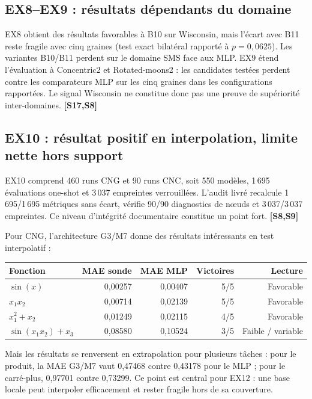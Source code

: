 \documentclass[11pt,a4paper]{article}
\newcommand{\src}[1]{\textbf{[#1]}}
\begin{document}
\subsection{EX8--EX9 : résultats dépendants du domaine}

EX8 obtient des résultats favorables à B10 sur Wisconsin, mais l'écart avec B11 reste fragile avec cinq graines (test exact bilatéral rapporté à \(p=0,0625\)). Les variantes B10/B11 perdent sur le domaine SMS face aux MLP. EX9 étend l'évaluation à Concentric2 et Rotated-moons2 : les candidates testées perdent contre les comparateurs MLP sur les cinq graines dans les configurations rapportées. Le signal Wisconsin ne constitue donc pas une preuve de supériorité inter-domaines. \src{S17,S8}

\subsection{EX10 : résultat positif en interpolation, limite nette hors support}

EX10 comprend 460 runs CNG et 90 runs CNC, soit 550 modèles, 1\,695 évaluations one-shot et 3\,037 empreintes verrouillées. L'audit livré recalcule 1\,695/1\,695 métriques sans écart, vérifie 90/90 diagnostics de nœuds et 3\,037/3\,037 empreintes. Ce niveau d'intégrité documentaire constitue un point fort. \src{S8,S9}

Pour CNG, l'architecture G3/M7 donne des résultats intéressants en test interpolatif :
\begin{center}
\small
\begin{tabular}{lrrrr}
\toprule
Fonction & MAE sonde & MAE MLP & Victoires & Lecture\\
\midrule
$\sin(x)$ & 0,00257 & 0,00407 & 5/5 & Favorable\\
$x_1x_2$ & 0,00714 & 0,02139 & 5/5 & Favorable\\
$x_1^2+x_2$ & 0,01249 & 0,02115 & 4/5 & Favorable\\
$\sin(x_1x_2)+x_3$ & 0,08580 & 0,10524 & 3/5 & Faible / variable\\
\bottomrule
\end{tabular}
\end{center}

Mais les résultats se renversent en extrapolation pour plusieurs tâches : pour le produit, la MAE G3/M7 vaut 0,47468 contre 0,43178 pour le MLP ; pour le carré-plus, 0,97701 contre 0,73299. Ce point est central pour EX12 : une base locale peut interpoler efficacement et rester fragile hors de sa couverture.
\end{document}
